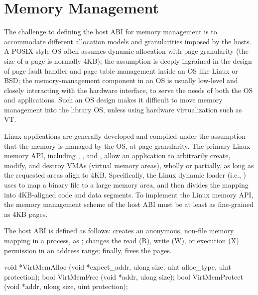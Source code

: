 \section{Memory Management}
\label{sec:abi:memory}


The challenge to defining the host ABI for memory management
is to accommodate different allocation models and granularities imposed by the hosts.
A POSIX-style OS often assumes dynamic allocation with page granularity (the size of a page is normally 4KB);
the assumption is deeply ingrained in the design of page fault handler and page table management
inside an OS like Linux or BSD;
the memory-management component in an OS
is usually low-level and closely interacting with the hardware interface,
to serve the needs of both the OS and applications.
Such an OS design makes it difficult to move memory management
into the library OS, unless using hardware virtualization such as VT.



Linux applications 
are generally developed and compiled under the assumption that the memory is managed
by the OS,
at page granularity.
The primary Linux memory API,
including , , and ,
allow an application
to arbitrarily create, modify, and destroy VMAs (virtual memory areas),
wholly or partially,
as long as the requested areas align to
4KB.
Specifically, the Linux dynamic loader (i.e., ) %
uses  to map a binary file to a large memory area,
and then divides the mapping into 4KB-aligned code and data segments.
To implement the Linux memory API,
the memory management scheme of the host ABI
must be at least as fine-grained as 4KB pages.


The host ABI is defined as follows:
 creates an anonymous, non-file memory mapping in a process, as ;
 changes the read (R), write (W), or execution (X) permission in an address range;
finally,  frees the pages.




\begin{paldef}
void *VirtMemAlloc   (void *expect_addr, ulong size,
                      uint alloc_type, uint protection);
bool  VirtMemFree    (void *addr, ulong size);
bool  VirtMemProtect (void *addr, ulong size,
                      uint protection);
\end{paldef}


